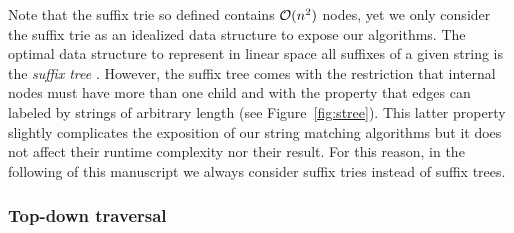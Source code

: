 Note that the suffix trie so defined contains $\mathcal{O}(n^2)$ nodes, yet we only consider the suffix trie as an idealized data structure to expose our algorithms.
The optimal data structure to represent in linear space all suffixes of a given string is the \emph{suffix tree} \citep{Morrison1968}.
However, the suffix tree comes with the restriction that internal nodes must have more than one child and with the property that edges can labeled by strings of arbitrary length (see Figure~\ref{fig:stree}).
This latter property slightly complicates the exposition of our string matching algorithms but it does not affect their runtime complexity nor their result.
For this reason, in the following of this manuscript we always consider \wlogs suffix tries instead of suffix trees.

\begin{figure}[h]
\caption{Suffix tree and suffix trie for the string ANANAS.}
\label{fig:stree}
\begin{subfigure}{.5\textwidth}
\begin{center}

\end{center}
\end{subfigure}%
\begin{subfigure}{.5\textwidth}
\begin{center}

\end{center}
\end{subfigure}
\end{figure}

\subsubsection{Top-down traversal}

